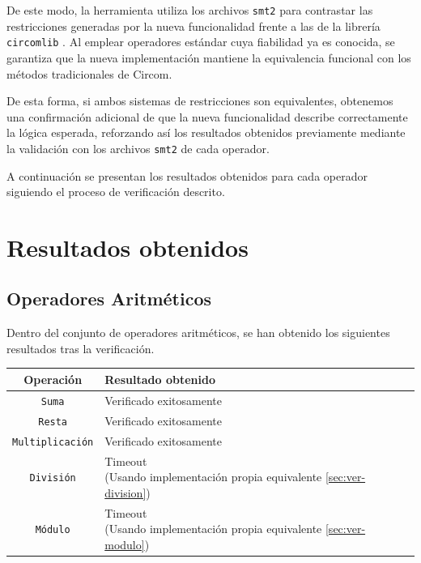 \documentclass[a4paper,12pt]{report}
\begin{document}
	\vspace{0.2cm}
	\noindent De este modo, la herramienta utiliza los archivos \texttt{smt2} para contrastar las restricciones generadas por la nueva funcionalidad frente a las de la librería \texttt{circomlib} \cite{iden3_circomlib}. Al emplear operadores estándar cuya fiabilidad ya es conocida, se garantiza que la nueva implementación mantiene la equivalencia funcional con los métodos tradicionales de Circom.
	
	\vspace{0.2cm}
	\noindent De esta forma, si ambos sistemas de restricciones son equivalentes, obtenemos una confirmación adicional de que la nueva funcionalidad describe correctamente la lógica esperada, reforzando así los resultados obtenidos previamente mediante la validación con los archivos \texttt{smt2} de cada operador.
	
	\vspace{0.2cm}
	\noindent A continuación se presentan los resultados obtenidos para cada operador siguiendo el proceso de verificación descrito.
	
	\section{Resultados obtenidos}
	
	\subsection{Operadores Aritméticos}
	
	\noindent Dentro del conjunto de operadores aritméticos, se han obtenido los siguientes resultados tras la verificación.
	
	\vspace{0.5cm}
	\begingroup %
	\renewcommand{\arraystretch}{2} 
	\begin{longtable}{|c|>{\centering\arraybackslash}m{10cm}|}
		\hline
		\textbf{Operación} & \textbf{Resultado obtenido} \\
		\hline
		
		\texttt{Suma} & Verificado exitosamente \checkmark \\
		\hline
		
		\texttt{Resta} & 
		Verificado exitosamente \checkmark \\
		\hline
		
		\texttt{Multiplicación} & 
		Verificado exitosamente \checkmark \\
		\hline
		
		\texttt{División} & \makecell[c]{Timeout \\ \footnotesize (Usando implementación propia equivalente \ref{sec:ver-division})} \\
		\hline
		
		\texttt{Módulo} & \makecell[c]{Timeout \\ \footnotesize (Usando implementación propia equivalente \ref{sec:ver-modulo})} \\
		\hline
	\end{longtable}
	\endgroup
	
\end{document}
